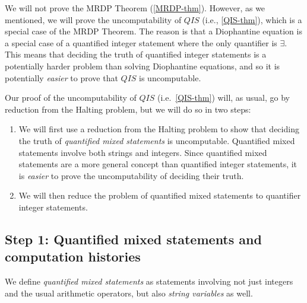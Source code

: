 We will not prove the MRDP Theorem (\cref{MRDP-thm}). However, as we
mentioned, we will prove the uncomputability of
\(\ensuremath{\mathit{QIS}}\) (i.e., \cref{QIS-thm}), which is a special
case of the MRDP Theorem. The reason is that a Diophantine equation is a
special case of a quantified integer statement where the only quantifier
is \(\exists\). This means that deciding the truth of quantified integer
statements is a potentially harder problem than solving Diophantine
equations, and so it is potentially \emph{easier} to prove that
\(\ensuremath{\mathit{QIS}}\) is uncomputable.


Our proof of the uncomputability of \(\ensuremath{\mathit{QIS}}\)
(i.e.~\cref{QIS-thm}) will, as usual, go by reduction from the Halting
problem, but we will do so in two steps:

\begin{enumerate}
\def\labelenumi{\arabic{enumi}.}
\item
  We will first use a reduction from the Halting problem to show that
  deciding the truth of \emph{quantified mixed statements} is
  uncomputable. Quantified mixed statements involve both strings and
  integers. Since quantified mixed statements are a more general concept
  than quantified integer statements, it is \emph{easier} to prove the
  uncomputability of deciding their truth.
\item
  We will then reduce the problem of quantified mixed statements to
  quantifier integer statements.
\end{enumerate}

\subsection{Step 1: Quantified mixed statements and computation
histories}\label{Step--Quantified-mixed-st}

We define \emph{quantified mixed statements} as statements involving not
just integers and the usual arithmetic operators, but also \emph{string
variables} as well.

